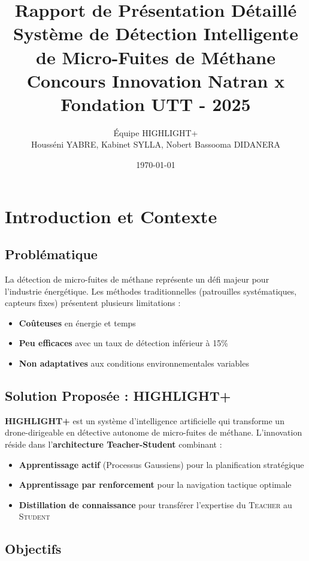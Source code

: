 \documentclass[12pt,a4paper]{article}
\title{\textbf{Rapport de Présentation Détaillé}\\[0.5em]
\Large Système de Détection Intelligente de Micro-Fuites de Méthane\\[0.3em]
\large Concours Innovation Natran x Fondation UTT - 2025}
\author{Équipe HIGHLIGHT+\\Housséni YABRE, Kabinet SYLLA, Nobert Bassooma DIDANERA}
\date{\today}
\newcommand{\highlight}{\textbf{HIGHLIGHT+}}
\newcommand{\teacher}{\textsc{Teacher}}
\newcommand{\student}{\textsc{Student}}
\begin{document}
\maketitle
\thispagestyle{empty}

\newpage
\tableofcontents
\newpage

\section{Introduction et Contexte}

\subsection{Problématique}

La détection de micro-fuites de méthane représente un défi majeur pour l'industrie énergétique. Les méthodes traditionnelles (patrouilles systématiques, capteurs fixes) présentent plusieurs limitations :

\begin{itemize}
    \item \textbf{Coûteuses} en énergie et temps
    \item \textbf{Peu efficaces} avec un taux de détection inférieur à 15\%
    \item \textbf{Non adaptatives} aux conditions environnementales variables
\end{itemize}

\subsection{Solution Proposée : \highlight}

\highlight{} est un système d'intelligence artificielle qui transforme un drone-dirigeable en détective autonome de micro-fuites de méthane. L'innovation réside dans l'\textbf{architecture Teacher-Student} combinant :

\begin{itemize}
    \item \textbf{Apprentissage actif} (Processus Gaussiens) pour la planification stratégique
    \item \textbf{Apprentissage par renforcement} pour la navigation tactique optimale
    \item \textbf{Distillation de connaissance} pour transférer l'expertise du \teacher{} au \student{}
\end{itemize}

\subsection{Objectifs}
\end{document}
